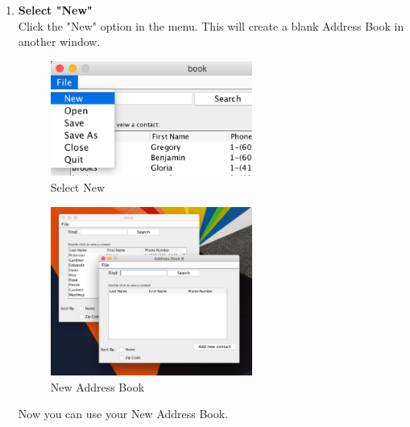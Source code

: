 \documentclass[a4paper, 11pt]{article}
\begin{document}
\begin{enumerate}[label=\textbf{\arabic*})]
    \item{\textbf{Select "New"}}\\ Click the "New" option in the menu. This will create a blank Address Book in another window.
    
    \begin{figure}[h!]
    \centering
      \includegraphics[width=250]{new_selection.png}
      \caption{Select New}
    \end{figure}
    
    \begin{figure}[h!]
    \centering
      \includegraphics[width=250]{new_address_book.png}
      \caption{New Address Book}
    \end{figure}
    
    Now you can use your New Address Book.
\end{enumerate}
\end{document}
